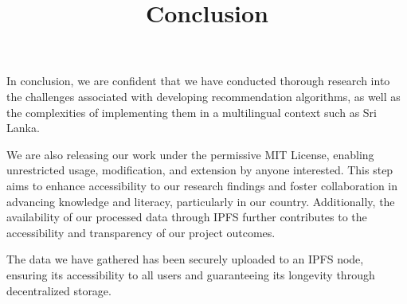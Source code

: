 \documentclass{article}
\title{Conclusion}
\author{}
\date{}
\begin{document}
\maketitle

In conclusion, we are confident that we have conducted thorough research into the challenges associated with developing recommendation algorithms, as well as the complexities of implementing them in a multilingual context such as Sri Lanka.

We are also releasing our work under the permissive MIT License, enabling unrestricted usage, modification, and extension by anyone interested. This step aims to enhance accessibility to our research findings and foster collaboration in advancing knowledge and literacy, particularly in our country. Additionally, the availability of our processed data through IPFS further contributes to the accessibility and transparency of our project outcomes.

The data we have gathered has been securely uploaded to an IPFS node, ensuring its accessibility to all users and guaranteeing its longevity through decentralized storage.
\end{document}
